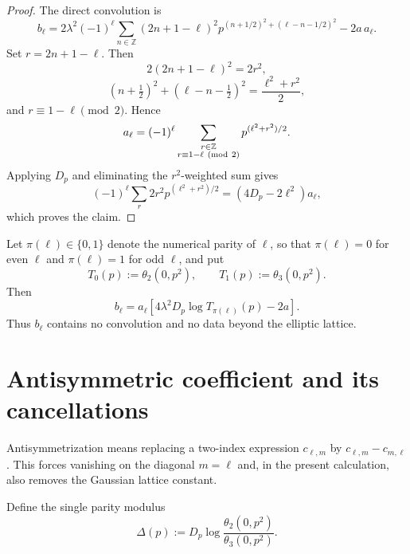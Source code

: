 \documentclass[11pt]{article}
\numberwithin{equation}{section}
\newcommand{\Dp}{D_p}
\begin{document}
\begin{proof}
The direct convolution is
\begin{equation}
b_\ell=2\lambda^2(-1)^\ell\sum_{n\in\mathbb Z}
(2n+1-\ell)^2
p^{(n+1/2)^2+(\ell-n-1/2)^2}-2a\,a_\ell.
\end{equation}
Set $r=2n+1-\ell$. Then
\begin{equation}
2(2n+1-\ell)^2=2r^2,
\end{equation}
\begin{equation}
(n+\tfrac12)^2+(\ell-n-\tfrac12)^2=\frac{\ell^2+r^2}{2},
\end{equation}
and $r\equiv1-\ell\pmod2$. Hence
\begin{equation}
a_\ell=(-1)^\ell
\sum_{\substack{r\in\mathbb Z\\r\equiv1-\ell\ ({\rm mod}\ 2)}}
p^{(\ell^2+r^2)/2}.
\end{equation}
Applying $\Dp$ and eliminating the $r^2$-weighted sum gives
\begin{equation}
(-1)^\ell\sum_r2r^2p^{(\ell^2+r^2)/2}
=(4\Dp-2\ell^2)a_\ell,
\end{equation}
which proves the claim.
\end{proof}

Let $\pi(\ell)\in\{0,1\}$ denote the numerical parity of $\ell$, so that $\pi(\ell)=0$ for even $\ell$ and $\pi(\ell)=1$ for odd $\ell$, and put
\begin{equation}
T_0(p):=\theta_2(0,p^2),\qquad T_1(p):=\theta_3(0,p^2).
\end{equation}
Then
\begin{equation}
\boxed{b_\ell=a_\ell\left[
4\lambda^2\Dp\log T_{\pi(\ell)}(p)-2a
\right].}
\end{equation}
Thus $b_\ell$ contains no convolution and no data beyond the elliptic lattice.

\section{Antisymmetric coefficient and its cancellations}
Antisymmetrization means replacing a two-index expression $c_{\ell,m}$ by $c_{\ell,m}-c_{m,\ell}$.  This forces vanishing on the diagonal $m=\ell$ and, in the present calculation, also removes the Gaussian lattice constant.

Define the single parity modulus
\begin{equation}
\boxed{\Delta(p):=\Dp\log\frac{\theta_2(0,p^2)}{\theta_3(0,p^2)}.}
\end{equation}
\end{document}
